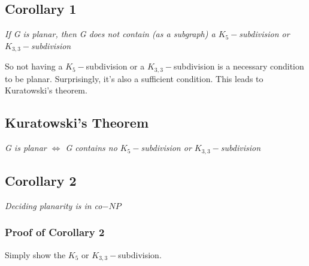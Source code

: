 \documentclass{report}
\begin{document}
\subsection{Corollary 1}
\begin{center}
\textit{If G is planar, then G does not contain (as a subgraph) a $K_5-$subdivision or $K_{3,3}-$subdivision}
\end{center}
So not having a $K_5-$subdivision or a $K_{3,3}-$subdivision is a necessary condition to be planar. Surprisingly, it's also a sufficient condition. This leads to Kuratowski's theorem.
\subsection{Kuratowski's Theorem}
\begin{center}
\textit{G is planar $\iff$ G contains no $K_5-$subdivision or $K_{3,3}-$subdivision}
\end{center}
\subsection{Corollary 2}
\begin{center}
\textit{Deciding planarity is in co$-NP$}
\end{center}
\subsubsection{Proof of Corollary 2}
Simply show the $K_5$ or $K_{3,3}-$subdivision.
\end{document}
